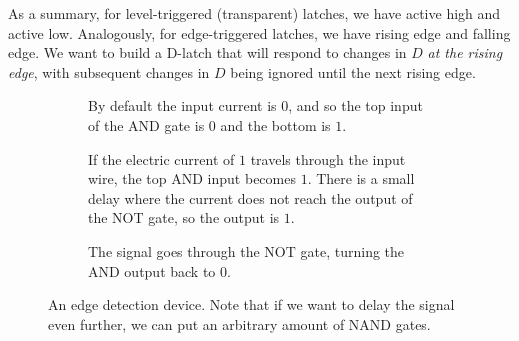   As a summary, for level-triggered (transparent) latches, we have active high and active low. Analogously, for edge-triggered latches, we have rising edge and falling edge. We want to build a D-latch that will respond to changes in $D$ \textit{at the rising edge}, with subsequent changes in $D$ being ignored until the next rising edge. 

  \begin{figure}[H]
    \centering
    \begin{subfigure}[b]{0.32\textwidth}
      \centering
      \caption{By default the input current is $0$, and so the top input of the AND gate is $0$ and the bottom is $1$. }
    \end{subfigure}
    \hfill 
    \begin{subfigure}[b]{0.32\textwidth}
      \centering
      \caption{If the electric current of $1$ travels through the input wire, the top AND input becomes $1$. There is a small delay where the current does not reach the output of the NOT gate, so the output is $1$. }
    \end{subfigure}
    \hfill 
    \begin{subfigure}[b]{0.32\textwidth}
      \centering
      \caption{The signal goes through the NOT gate, turning the AND output back to $0$.}
    \end{subfigure}
    \caption{An edge detection device. Note that if we want to delay the signal even further, we can put an arbitrary amount of NAND gates.}
  \end{figure}

